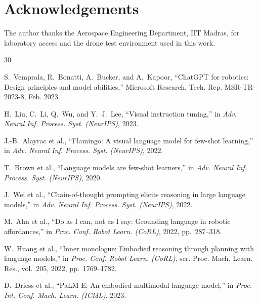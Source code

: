 \documentclass[journal]{IEEEtran}
\begin{document}
\section*{Acknowledgements}

The author thanks the Aerospace Engineering Department, IIT Madras, for
laboratory access and the drone test environment used in this work.


\begin{thebibliography}{30}

S.~Vemprala, R.~Bonatti, A.~Bucker, and A.~Kapoor,
``ChatGPT for robotics: Design principles and model abilities,''
Microsoft Research, Tech. Rep. MSR-TR-2023-8, Feb. 2023.

H.~Liu, C.~Li, Q.~Wu, and Y.~J.~Lee,
``Visual instruction tuning,''
in \emph{Adv. Neural Inf. Process. Syst. (NeurIPS)}, 2023.

J.-B.~Alayrac et al.,
``Flamingo: A visual language model for few-shot learning,''
in \emph{Adv. Neural Inf. Process. Syst. (NeurIPS)}, 2022.

T.~Brown et al.,
``Language models are few-shot learners,''
in \emph{Adv. Neural Inf. Process. Syst. (NeurIPS)}, 2020.

J.~Wei et al.,
``Chain-of-thought prompting elicits reasoning in large language models,''
in \emph{Adv. Neural Inf. Process. Syst. (NeurIPS)}, 2022.

M.~Ahn et al.,
``Do as I can, not as I say: Grounding language in robotic affordances,''
in \emph{Proc. Conf. Robot Learn. (CoRL)}, 2022, pp.~287--318.

W.~Huang et al.,
``Inner monologue: Embodied reasoning through planning with language models,''
in \emph{Proc. Conf. Robot Learn. (CoRL)}, ser. Proc. Mach. Learn. Res.,
vol.~205, 2022, pp.~1769--1782.

D.~Driess et al.,
``PaLM-E: An embodied multimodal language model,''
in \emph{Proc. Int. Conf. Mach. Learn. (ICML)}, 2023.


\end{thebibliography}
\end{document}
